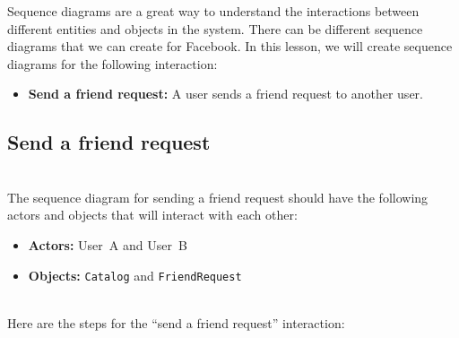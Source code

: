 

Sequence diagrams are a great way to understand the interactions between different entities and objects in the system. There can be different sequence diagrams that we can create for Facebook. In this lesson, we will create sequence diagrams for the following interaction:

\begin{itemize}
\item
\protect{}\label{jKkzImlT3YpPqKRKuqLR2}
\textbf{Send a friend request:} A user sends a friend request to another user.
\end{itemize}

\subsection{Send a friend request}\label{3FS_rdA0ggKzHzgmO6D-T}
\\
The sequence diagram for sending a friend request should have the following actors and objects that will interact with each other:

\begin{itemize}
\item
\protect{}\label{JwdMtPRxzhyvMYQlz5L6S}
\textbf{Actors:} User\ A and User\ B
\item
\protect{}\label{X0q9EZJUomfO9B2pr7Zmx}
\textbf{Objects:} \texttt{Catalog} and \texttt{FriendRequest}
\end{itemize}
\\
Here are the steps for the ``send a friend request'' interaction:

